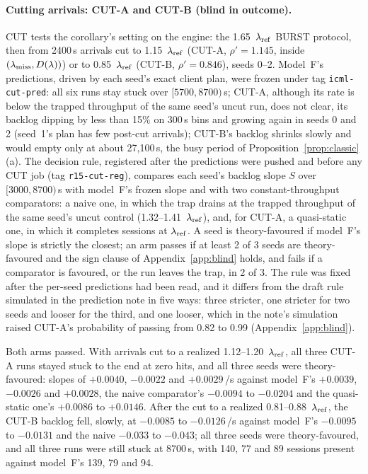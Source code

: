 \paragraph{Cutting arrivals: CUT-A and CUT-B (blind in outcome).} CUT tests the corollary's setting on the engine: the 1.65~$\lambda_{\mathrm{ref}}$ BURST
protocol, then from 2400\,s arrivals cut to 1.15~$\lambda_{\mathrm{ref}}$ (CUT-A, $\rho'=1.145$, inside $(\lambda_{\mathrm{miss}},D(\lambda))$) or to 0.85~$\lambda_{\mathrm{ref}}$
(CUT-B, $\rho'=0.846$), seeds 0--2. Model~F's predictions, driven by each seed's exact client plan, were frozen under tag
\texttt{icml-cut-pred}: all six runs stay stuck over $[5700,8700)$\,s; CUT-A, although its rate is below the trapped throughput of
the same seed's uncut run, does not clear, its backlog dipping by less than 15\% on 300\,s bins and growing again in seeds 0 and 2 (seed~1's plan
has few post-cut arrivals); CUT-B's backlog shrinks slowly and would empty only at about 27{,}100\,s, the busy period of
Proposition~\ref{prop:classic}(a). The decision rule, registered after the predictions were pushed and before any CUT job (tag
\texttt{r15-cut-reg}), compares each seed's backlog slope $S$ over $[3000,8700)$\,s with model~F's frozen slope and with two
constant-throughput comparators: a naive one, in which the trap drains at the trapped throughput of the same seed's uncut control
(1.32--1.41~$\lambda_{\mathrm{ref}}$), and, for CUT-A, a quasi-static one, in which it completes sessions at $\lambda_{\mathrm{ref}}$. A seed is theory-favoured if
model~F's slope is strictly the closest; an arm passes if at least 2 of 3 seeds are theory-favoured and the sign clause of Appendix~\ref{app:blind} holds, and fails if a
comparator is favoured, or the run leaves the trap, in 2 of 3. The rule was fixed after the per-seed predictions had been read, and it
differs from the draft rule simulated in the prediction note in five ways: three stricter, one stricter for two seeds and looser for
the third, and one looser, which in the note's simulation raised CUT-A's probability of passing from 0.82 to 0.99
(Appendix~\ref{app:blind}).

Both arms passed. With arrivals cut to a realized 1.12--1.20~$\lambda_{\mathrm{ref}}$, all three CUT-A runs stayed stuck to the end at zero hits, and
all three seeds were theory-favoured: slopes of $+0.0040$, $-0.0022$ and $+0.0029$\,/s against model~F's $+0.0039$, $-0.0026$ and
$+0.0028$, the naive comparator's $-0.0094$ to $-0.0204$ and the quasi-static one's $+0.0086$ to $+0.0146$. After the cut to a realized
0.81--0.88~$\lambda_{\mathrm{ref}}$, the CUT-B backlog fell, slowly, at $-0.0085$ to $-0.0126$\,/s against model~F's $-0.0095$ to $-0.0131$ and the
naive $-0.033$ to $-0.043$; all three seeds were theory-favoured, and all three runs were still stuck at 8700\,s, with 140, 77 and 89
sessions present against model~F's 139, 79 and 94.

